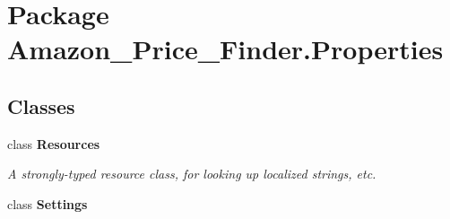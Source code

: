 \hypertarget{namespace_amazon___price___finder_1_1_properties}{\section{Package Amazon\-\_\-\-Price\-\_\-\-Finder.\-Properties}
\label{namespace_amazon___price___finder_1_1_properties}
}
\subsection*{Classes}
\begin{DoxyCompactItemize}
\item 
class {\bfseries Resources}
\begin{DoxyCompactList}\small\item\em A strongly-\/typed resource class, for looking up localized strings, etc. \end{DoxyCompactList}\item 
class {\bfseries Settings}
\end{DoxyCompactItemize}
